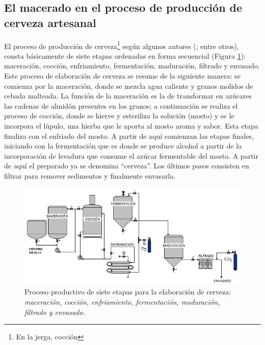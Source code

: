     \subsection{El macerado en el proceso de producción de cerveza artesanal}
    \par
    El proceso de producción de cerveza\footnote{En la jerga, cocción} según algunos autores (\cite{Dummies08,DogBrewery,AmericanHomeBrewers18, Novozymes13}; entre otros), consta básicamente de siete etapas ordenadas en forma secuencial (Figura \ref{ProcFab}): maceración, cocción, enfriamiento, fermentación, maduración, filtrado y envasado. Este proceso de elaboración de cerveza se resume de la siguiente manera: se comienza por la maceración, donde se mezcla agua caliente y granos molidos de cebada malteada. La función de la maceración es la de transformar en azúcares las cadenas de almidón presentes en los granos; a continuación se realiza el proceso de cocción, donde se hierve y esteriliza la solución (mosto) y se le incorpora el lúpulo, una hierba que le aporta al mosto aroma y sabor. Esta etapa finaliza con el enfriado del mosto. A partir de aquí comienzan las etapas finales, iniciando con la fermentación que es donde se produce alcohol a partir de la incorporación de levadura que consume el azúcar fermentable del mosto. A partir de aquí el preparado ya se denomina ``cerveza''. Los últimos pasos consisten en filtrar para remover sedimentos y finalmente envasarla.
 
    \begin{figure}[h]
		\centerline{\includegraphics[scale=0.75]{introduccion/Etapasdelproceso.jpg}}
		\caption{Proceso productivo de siete etapas para la elaboración de cerveza: \textit{maceración, cocción, enfriamiento, fermentación, maduración, filtrado y envasado.}}
	    \label{ProcFab}
	\end{figure}
	
